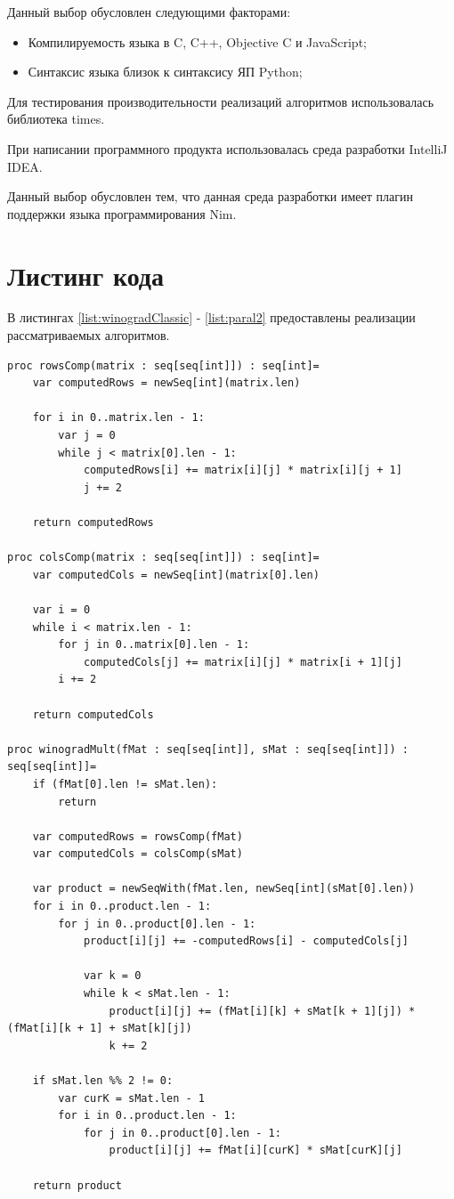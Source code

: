 \documentclass[12pt]{report}
\begin{document}
Данный выбор обусловлен следующими факторами:
\begin{itemize}
\item Компилируемость языка в C, C++, Objective C и JavaScript;
\item Синтаксис языка близок к синтаксису ЯП Python;
\end{itemize}

Для тестирования производительности реализаций алгоритмов использовалась библиотека times.

При написании программного продукта использовалась среда разработки IntelliJ IDEA.

Данный выбор обусловлен тем, что данная среда разработки имеет плагин поддержки языка программирования Nim.

\section{Листинг кода}
В листингах \ref{list:winogradClassic} - \ref{list:paral2} предоставлены реализации рассматриваемых алгоритмов.
\begin{lstlisting}[caption=Алгоритм Капперсмита-Винограда в последовательной реализации,
label={list:winogradClassic}]
proc rowsComp(matrix : seq[seq[int]]) : seq[int]=
    var computedRows = newSeq[int](matrix.len)

    for i in 0..matrix.len - 1:
        var j = 0
        while j < matrix[0].len - 1:
            computedRows[i] += matrix[i][j] * matrix[i][j + 1]
            j += 2

    return computedRows

proc colsComp(matrix : seq[seq[int]]) : seq[int]=
    var computedCols = newSeq[int](matrix[0].len)

    var i = 0
    while i < matrix.len - 1:
        for j in 0..matrix[0].len - 1:
            computedCols[j] += matrix[i][j] * matrix[i + 1][j]
        i += 2

    return computedCols

proc winogradMult(fMat : seq[seq[int]], sMat : seq[seq[int]]) : seq[seq[int]]=
    if (fMat[0].len != sMat.len):
        return

    var computedRows = rowsComp(fMat)
    var computedCols = colsComp(sMat)

    var product = newSeqWith(fMat.len, newSeq[int](sMat[0].len))
    for i in 0..product.len - 1:
        for j in 0..product[0].len - 1:
            product[i][j] += -computedRows[i] - computedCols[j]

            var k = 0
            while k < sMat.len - 1:
                product[i][j] += (fMat[i][k] + sMat[k + 1][j]) * (fMat[i][k + 1] + sMat[k][j])
                k += 2

    if sMat.len %% 2 != 0:
        var curK = sMat.len - 1
        for i in 0..product.len - 1:
            for j in 0..product[0].len - 1:
                product[i][j] += fMat[i][curK] * sMat[curK][j]

    return product
\end{lstlisting}
\end{document}
